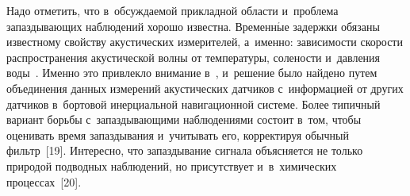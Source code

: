 \begin{multicols}{2}
     Надо отметить, что в~обсуждаемой прикладной об\-ласти и~проб\-ле\-ма 
за\-паз\-ды\-ва\-ющих наблюдений хорошо известна. Временн$\acute{\mbox{ы}}$е за\-держ\-ки обязаны\linebreak 
известному свойству акус\-ти\-че\-ских измерителей, а~именно: за\-ви\-си\-мости 
ско\-рости распространения акус\-ти\-че\-ской волны от температуры, со\-ле\-ности\linebreak 
и~дав\-ле\-ния воды~\cite{18-bos}. Именно это при\-влек\-ло внимание в~\cite{11-bos}, 
и~решение было найде\-но путем объединения данных измерений 
акус\-ти\-че\-ских датчиков с~информацией от других датчиков в~\mbox{бортовой} 
инерциальной навигационной сис\-те\-ме. Более типичный вариант борьбы 
с~за\-паз\-ды\-ва\-ющи\-ми наблюдениями со\-сто\-ит в~том, чтобы оценивать время 
за\-паз\-ды\-ва\-ния и~учитывать его, корректируя обыч\-ный фильтр~[19]. 
Интересно, что за\-паз\-ды\-ва\-ние сигнала объясняется не только природой 
подводных наблюдений, но присутствует и~в~химических процессах~[20].
     

\end{multicols}
